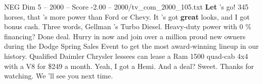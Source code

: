 \begin{textsample}{NEG Dim 5 – 2000 – Score -2.00 – 2000/tv\_com\_2000\_105.txt}  \label{ex:f5_neg_034}
\textbf{Let} 's go! 345 horses, that 's more power than Ford or Chevy.
It 's got \textbf{great} looks, and I got bonus cash.
Three words, Gellman 's Turbo Diesel.
Heavy-duty power with 0 \% financing?
Done deal.
Hurry in now and join over a million proud new owners during the Dodge Spring Sales Event to get the most award-winning lineup in our history.
Qualified Daimler Chrysler lessees can lease a Ram 1500 quad-cab 4x4 with a V8 for \$249 a month.
Yeah, I got a Hemi.
And a deal?
Sweet.
Thanks for watching.
We 'll see you next time.

\end{textsample}
